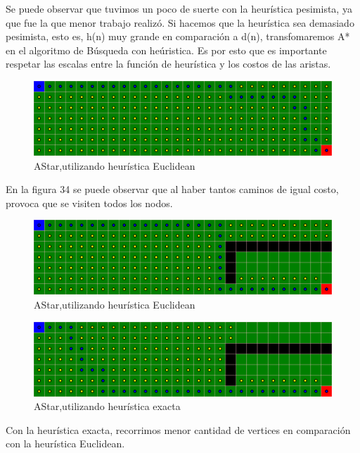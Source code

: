 Se puede observar que tuvimos un poco de suerte con la heurística pesimista, ya que fue la que menor trabajo realizó.
Si hacemos que la heurística sea demasiado pesimista, esto es, h(n) muy grande en comparación a d(n), transfomaremos 
A* en el algoritmo de Búsqueda con heúristica. Es por esto que es importante respetar las escalas entre la función de heurística y los costos de las aristas.



\begin{figure}[H]
\centering
\includegraphics[width=\textwidth]{AStar/grafo2Euclidean.png}
\caption{AStar,utilizando heurística Euclidean}
\end{figure}

En la figura 34 se puede observar que al haber tantos caminos de igual costo, provoca que se visiten todos los nodos.


\begin{figure}[H]
\centering
\includegraphics[width=\textwidth]{AStar/grafo3Euclidean.png}
\caption{AStar,utilizando heurística Euclidean}
\end{figure}

\begin{figure}[H]
\centering
\includegraphics[width=\textwidth]{AStar/grafo3HeuristicaExacta.png}
\caption{AStar,utilizando heurística exacta}
\end{figure}

Con la heurística exacta, recorrimos menor cantidad de vertices en comparación con la heurística Euclidean.

